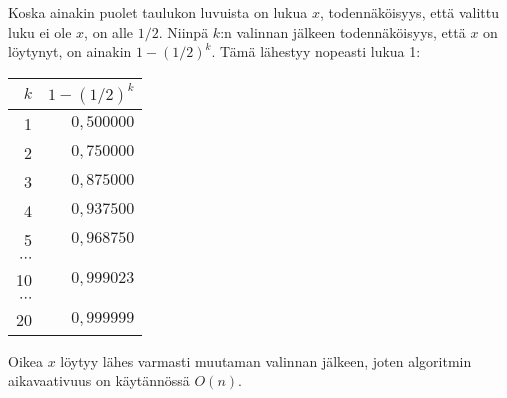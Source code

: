 Koska ainakin puolet taulukon luvuista on lukua $x$,
todennäköisyys, että valittu luku ei ole $x$, on alle $1/2$.
Niinpä $k$:n valinnan jälkeen todennäköisyys,
että $x$ on löytynyt, on ainakin $1-(1/2)^k$.
Tämä lähestyy nopeasti lukua 1:

\begin{center}
\begin{tabular}{rr}
$k$ & \phantom{XXXXX} $1-(1/2)^k$ \\
\hline
1 & $0{,}500000$ \\
2 & $0{,}750000$ \\
3 & $0{,}875000$ \\
4 & $0{,}937500$ \\
5 & $0{,}968750$ \\
$\cdots$ \\
10 & $0{,}999023$ \\
$\cdots$ \\
20 & $0{,}999999$ \\
\end{tabular}
\end{center}

Oikea $x$ löytyy lähes varmasti muutaman valinnan jälkeen,
joten algoritmin aikavaativuus on käytännössä $O(n)$.

